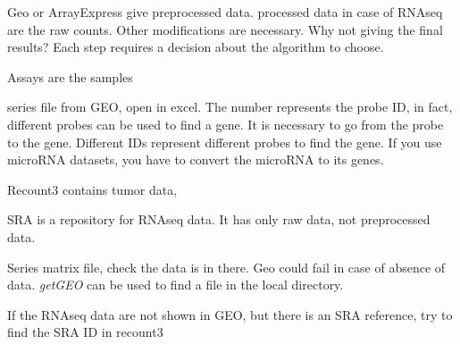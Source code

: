 Geo or ArrayExpress give preprocessed data. processed data in case of RNAseq are the raw counts. Other modifications are necessary. Why not giving the final results? Each step requires a decision about the algorithm to choose.


Assays are the samples


series file from GEO, open in excel. The number represents the probe ID, in fact, different probes can be used to find a gene. It is necessary to go from the probe to the gene. Different IDs represent different probes to find the gene. If you use microRNA datasets, you have to convert the microRNA to its genes. 

Recount3 contains tumor data,  

SRA is a repository for RNAseq data. It has only raw data, not preprocessed data. 

Series matrix file, check the data is in there. Geo could fail in case of absence of data. \textit{getGEO} can be used to find a file in the local directory.

If the RNAseq data are not shown in GEO, but there is an SRA reference, try to find the SRA ID in recount3